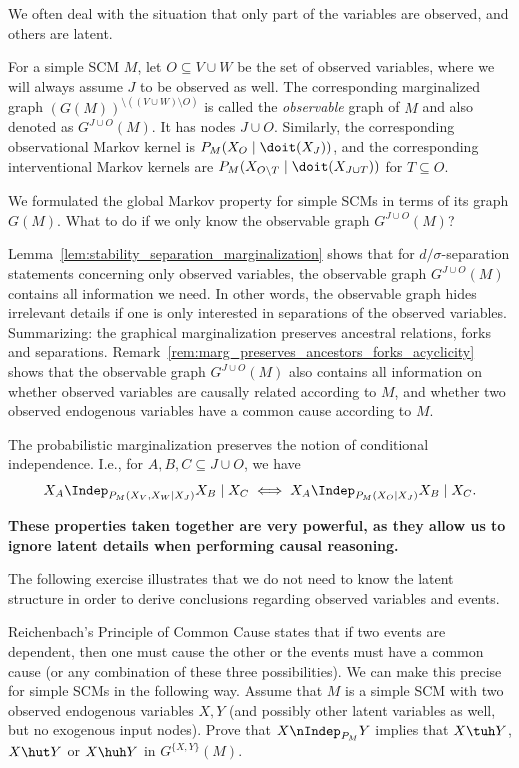 We often deal with the situation that only part of the variables are observed, and others are latent.
\begin{Not}
For a simple SCM $M$, let $O \subseteq V \cup W$ be the set of observed variables,
where we will always assume $J$ to be observed as well.
The corresponding marginalized graph $(G(M))^{\setminus((V \cup W) \setminus O)}$  is called the
\emph{observable} graph of $M$ and also denoted as $G^{J\cup O}(M)$. It has nodes $J \cup O$.
Similarly, the corresponding observational Markov kernel is $P_{M}(X_O \mid \doit(X_J))$, and the
corresponding interventional Markov kernels are $P_{M}(X_{O\setminus T} \mid \doit(X_{J\cup T}))$
for $T \subseteq O$.
\end{Not}
We formulated the global Markov property for simple SCMs in terms of its graph $G(M)$. 
What to do if we only know the observable graph $G^{J \cup O}(M)$? 
\begin{Rem}
Lemma~\ref{lem:stability_separation_marginalization} shows that for $d/\sigma$-separation statements
concerning only observed variables, the observable graph $G^{J \cup O}(M)$ contains all information we need.
In other words, the observable graph hides irrelevant details if one is only interested in separations
of the observed variables.
Summarizing: the graphical marginalization preserves ancestral relations, forks and separations.
Remark~\ref{rem:marg_preserves_ancestors_forks_acyclicity} shows that the observable graph $G^{J \cup O}(M)$
also contains all information on whether observed variables are causally related according to $M$,
and whether two observed endogenous variables have a common cause according to $M$.

The probabilistic marginalization preserves the notion of conditional independence. I.e.,
for $A, B, C \subseteq J \cup O$, we have
  $$X_A \Indep_{P_{M}(X_V,X_W \mid X_J)} X_B \mid X_C \iff X_A \Indep_{P_{M}(X_O \mid X_J)} X_B \mid X_C.$$

\textbf{These properties taken together are very powerful, as they allow us to ignore latent details when performing
causal reasoning.}
\end{Rem}

The following exercise illustrates that we do not need to know the latent structure in order
to derive conclusions regarding observed variables and events.
\begin{Exc}
  Reichenbach's Principle of Common Cause states that if two events are dependent,
  then one must cause the other or the events must have a common cause (or any combination of these three possibilities).
  We can make this precise for simple SCMs in the following way. Assume that $M$
  is a simple SCM with two observed endogenous variables $X,Y$ (and possibly other
  latent variables as well, but no exogenous input nodes). Prove that 
  $X \nIndep_{P_{M}} Y$
  implies that $X \tuh Y$,
  $X \hut Y$ or $X \huh Y$ in $G^{\{X,Y\}}(M)$.
\end{Exc}


